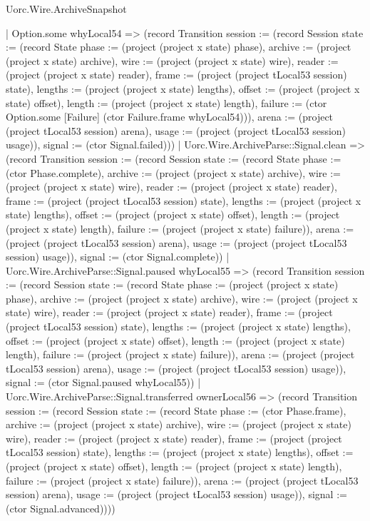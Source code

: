 \begin{lexlean}{Uorc.Wire.ArchiveSnapshot}
\begin{semanticmodule}
{          | Option.some whyLocal54 => (record Transition {session := (record Session {state := (record State {phase := (project (project x state) phase), archive := (project (project x state) archive), wire := (project (project x state) wire), reader := (project (project x state) reader), frame := (project (project tLocal53 session) state), lengths := (project (project x state) lengths), offset := (project (project x state) offset), length := (project (project x state) length), failure := (ctor Option.some [Failure] (ctor Failure.frame whyLocal54))}), arena := (project (project tLocal53 session) arena), usage := (project (project tLocal53 session) usage)}), signal := (ctor Signal.failed)}))
        | Uorc.Wire.ArchiveParse::Signal.clean => (record Transition {session := (record Session {state := (record State {phase := (ctor Phase.complete), archive := (project (project x state) archive), wire := (project (project x state) wire), reader := (project (project x state) reader), frame := (project (project tLocal53 session) state), lengths := (project (project x state) lengths), offset := (project (project x state) offset), length := (project (project x state) length), failure := (project (project x state) failure)}), arena := (project (project tLocal53 session) arena), usage := (project (project tLocal53 session) usage)}), signal := (ctor Signal.complete)})
        | Uorc.Wire.ArchiveParse::Signal.paused whyLocal55 => (record Transition {session := (record Session {state := (record State {phase := (project (project x state) phase), archive := (project (project x state) archive), wire := (project (project x state) wire), reader := (project (project x state) reader), frame := (project (project tLocal53 session) state), lengths := (project (project x state) lengths), offset := (project (project x state) offset), length := (project (project x state) length), failure := (project (project x state) failure)}), arena := (project (project tLocal53 session) arena), usage := (project (project tLocal53 session) usage)}), signal := (ctor Signal.paused whyLocal55)})
        | Uorc.Wire.ArchiveParse::Signal.transferred ownerLocal56 => (record Transition {session := (record Session {state := (record State {phase := (ctor Phase.frame), archive := (project (project x state) archive), wire := (project (project x state) wire), reader := (project (project x state) reader), frame := (project (project tLocal53 session) state), lengths := (project (project x state) lengths), offset := (project (project x state) offset), length := (project (project x state) length), failure := (project (project x state) failure)}), arena := (project (project tLocal53 session) arena), usage := (project (project tLocal53 session) usage)}), signal := (ctor Signal.advanced)})))
}
\end{semanticmodule}
\end{lexlean}
